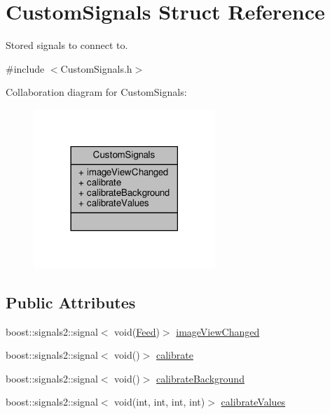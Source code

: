 \hypertarget{struct_custom_signals}{}\section{Custom\+Signals Struct Reference}
\label{struct_custom_signals}


Stored signals to connect to.  




{\ttfamily \#include $<$Custom\+Signals.\+h$>$}



Collaboration diagram for Custom\+Signals\+:
\nopagebreak
\begin{figure}[H]
\begin{center}
\leavevmode
\includegraphics[width=194pt]{struct_custom_signals__coll__graph}
\end{center}
\end{figure}
\subsection*{Public Attributes}
\begin{DoxyCompactItemize}
\item 
boost\+::signals2\+::signal$<$ void(\hyperlink{_capture_and_detect_8h_a425a93be55e757f5e351ec9d6770c50e}{Feed})$>$ \hyperlink{struct_custom_signals_ac453891590a3536656f21a5ef55efcbe}{image\+View\+Changed}
\item 
boost\+::signals2\+::signal$<$ void()$>$ \hyperlink{struct_custom_signals_affeb9cf3ae6f465af657b9e13f2f51e6}{calibrate}
\item 
boost\+::signals2\+::signal$<$ void()$>$ \hyperlink{struct_custom_signals_aa853ceb0f87d27fb4d8318b98a5e36c6}{calibrate\+Background}
\item 
boost\+::signals2\+::signal$<$ void(int, int, int, int)$>$ \hyperlink{struct_custom_signals_a9383d26c828ce25b99c0a64fc8adcdc2}{calibrate\+Values}
\end{DoxyCompactItemize}


